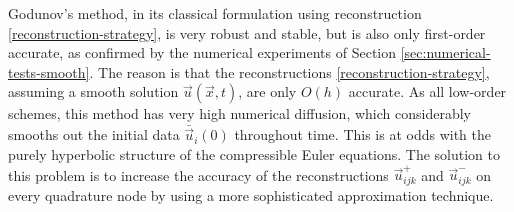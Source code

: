 Godunov's method, in its classical formulation using reconstruction
\eqref{reconstruction-strategy}, is very robust and stable, but is
also only first-order accurate, as confirmed by the numerical experiments
of Section \ref{sec:numerical-tests-smooth}.
The reason is that the reconstructions \eqref{reconstruction-strategy},
assuming a smooth solution $\vec{u}(\vec{x},t)$, are only $O(h)$ accurate.
As all low-order schemes, this method has very high numerical diffusion,
which considerably smooths out the initial data $\bar{\vec{u}}_{i}(0)$
throughout time. This is at odds with the purely hyperbolic structure
of the compressible Euler equations.
The solution to this problem is to increase the accuracy of the reconstructions
$\vec{u}_{ijk}^+$ and $\vec{u}_{ijk}^-$ on every quadrature node
by using a more sophisticated approximation technique.

